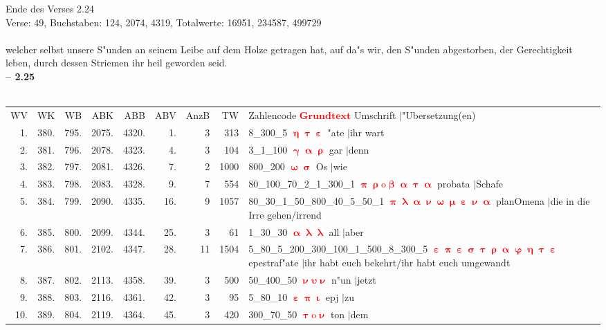 \documentclass[a4paper,10pt,landscape]{article}
\begin{document}
Ende des Verses 2.24\\
Verse: 49, Buchstaben: 124, 2074, 4319, Totalwerte: 16951, 234587, 499729\\
\\
welcher selbst unsere S"unden an seinem Leibe auf dem Holze getragen hat, auf da"s wir, den S"unden abgestorben, der Gerechtigkeit leben, durch dessen Striemen ihr heil geworden seid.\\
\newpage 
{\bf -- 2.25}\\
\medskip \\
\begin{tabular}{rrrrrrrrp{120mm}}
WV&WK&WB&ABK&ABB&ABV&AnzB&TW&Zahlencode \textcolor{red}{$\boldsymbol{Grundtext}$} Umschrift $|$"Ubersetzung(en)\\
1.&380.&795.&2075.&4320.&1.&3&313&8\_300\_5 \textcolor{red}{$\boldsymbol{\upeta\uptau\upepsilon}$} "ate $|$ihr wart\\
2.&381.&796.&2078.&4323.&4.&3&104&3\_1\_100 \textcolor{red}{$\boldsymbol{\upgamma\upalpha\uprho}$} gar $|$denn\\
3.&382.&797.&2081.&4326.&7.&2&1000&800\_200 \textcolor{red}{$\boldsymbol{\upomega\upsigma}$} Os $|$wie\\
4.&383.&798.&2083.&4328.&9.&7&554&80\_100\_70\_2\_1\_300\_1 \textcolor{red}{$\boldsymbol{\uppi\uprho\mathrm{o}\upbeta\upalpha\uptau\upalpha}$} probata $|$Schafe\\
5.&384.&799.&2090.&4335.&16.&9&1057&80\_30\_1\_50\_800\_40\_5\_50\_1 \textcolor{red}{$\boldsymbol{\uppi\uplambda\upalpha\upnu\upomega\upmu\upepsilon\upnu\upalpha}$} planOmena $|$die in die Irre gehen/irrend\\
6.&385.&800.&2099.&4344.&25.&3&61&1\_30\_30 \textcolor{red}{$\boldsymbol{\upalpha\uplambda\uplambda}$} all $|$aber\\
7.&386.&801.&2102.&4347.&28.&11&1504&5\_80\_5\_200\_300\_100\_1\_500\_8\_300\_5 \textcolor{red}{$\boldsymbol{\upepsilon\uppi\upepsilon\upsigma\uptau\uprho\upalpha\upvarphi\upeta\uptau\upepsilon}$} epestraf"ate $|$ihr habt euch bekehrt/ihr habt euch umgewandt\\
8.&387.&802.&2113.&4358.&39.&3&500&50\_400\_50 \textcolor{red}{$\boldsymbol{\upnu\upsilon\upnu}$} n"un $|$jetzt\\
9.&388.&803.&2116.&4361.&42.&3&95&5\_80\_10 \textcolor{red}{$\boldsymbol{\upepsilon\uppi\upiota}$} epj $|$zu\\
10.&389.&804.&2119.&4364.&45.&3&420&300\_70\_50 \textcolor{red}{$\boldsymbol{\uptau\mathrm{o}\upnu}$} ton $|$dem\\

\end{tabular}
\end{document}
